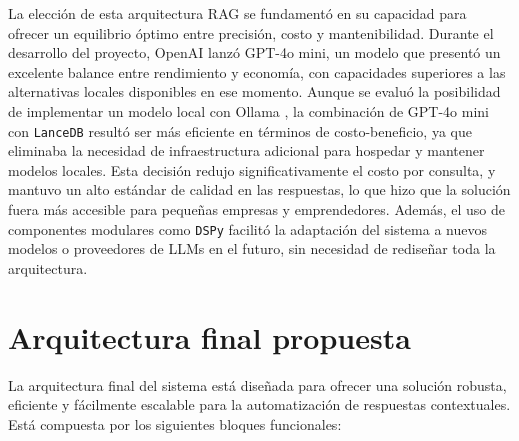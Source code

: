 La elección de esta arquitectura RAG se fundamentó en su capacidad para ofrecer un equilibrio óptimo entre precisión, costo y mantenibilidad. Durante el desarrollo del proyecto, OpenAI lanzó GPT-4o mini, un modelo que presentó un excelente balance entre rendimiento y economía, con capacidades superiores a las alternativas locales disponibles en ese momento. Aunque se evaluó la posibilidad de implementar un modelo local con Ollama \citep{Ollama}, la combinación de GPT-4o mini con \texttt{LanceDB} resultó ser más eficiente en términos de costo-beneficio, ya que eliminaba la necesidad de infraestructura adicional para hospedar y mantener modelos locales. Esta decisión redujo significativamente el costo por consulta, y mantuvo un alto estándar de calidad en las respuestas, lo que hizo que la solución fuera más accesible para pequeñas empresas y emprendedores. Además, el uso de componentes modulares como \texttt{DSPy} facilitó la adaptación del sistema a nuevos modelos o proveedores de LLMs en el futuro, sin necesidad de rediseñar toda la arquitectura.
\section{Arquitectura final propuesta}

La arquitectura final del sistema está diseñada para ofrecer una solución robusta, eficiente y fácilmente escalable para la automatización de respuestas contextuales. Está compuesta por los siguientes bloques funcionales:

